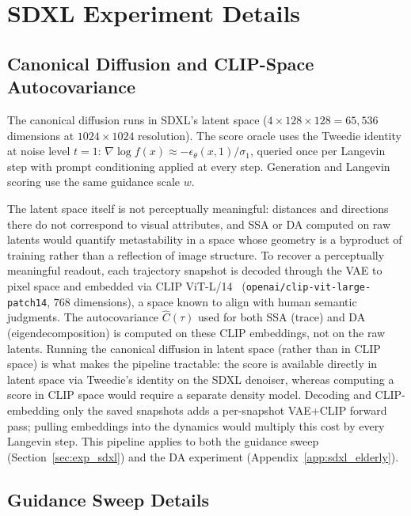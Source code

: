 \documentclass{article}
\begin{document}
\section{SDXL Experiment Details}
\label{app:sdxl_details}



\subsection{Canonical Diffusion and CLIP-Space Autocovariance}
\label{app:sdxl_pipeline}

The canonical diffusion runs in SDXL's latent space ($4 \times 128 \times 128 = 65{,}536$ dimensions at $1024 \times 1024$ resolution). The score oracle uses the Tweedie identity at noise level $t = 1$: $\nabla \log f(x) \approx -\epsilon_\theta(x, 1) / \sigma_1$, queried once per Langevin step with prompt conditioning applied at every step. Generation and Langevin scoring use the same guidance scale $w$.

The latent space itself is not perceptually meaningful: distances and directions there do not correspond to visual attributes, and SSA or DA computed on raw latents would quantify metastability in a space whose geometry is a byproduct of training rather than a reflection of image structure. To recover a perceptually meaningful readout, each trajectory snapshot is decoded through the VAE to pixel space and embedded via CLIP ViT-L/14~\cite{radford2021learning} (\texttt{openai/clip-vit-large-patch14}, $768$ dimensions), a space known to align with human semantic judgments. The autocovariance $\hat{C}(\tau)$ used for both SSA (trace) and DA (eigendecomposition) is computed on these CLIP embeddings, not on the raw latents. Running the canonical diffusion in latent space (rather than in CLIP
space) is what makes the pipeline tractable: the score is available
directly in latent space via Tweedie's identity on the SDXL denoiser,
whereas computing a score in CLIP space would require a separate
density model. Decoding and CLIP-embedding only the saved snapshots
adds a per-snapshot VAE+CLIP forward pass; pulling embeddings into the
dynamics would multiply this cost by every Langevin step. This pipeline applies to both the guidance sweep (Section~\ref{sec:exp_sdxl}) and the DA experiment (Appendix~\ref{app:sdxl_elderly}).

\subsection{Guidance Sweep Details}
\label{app:sdxl_guidance_details}
\end{document}
